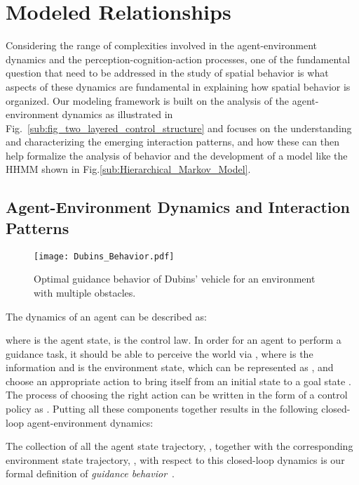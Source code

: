 \documentclass[journal]{IEEEtran}
\begin{document}
\section{Modeled Relationships}



Considering the range of complexities involved in the agent-environment dynamics and the perception-cognition-action processes, one of the fundamental question that need to be addressed in the study of spatial behavior is what aspects of these dynamics are fundamental in explaining how spatial behavior is organized.  Our modeling framework is built on the analysis of the agent-environment dynamics  as illustrated in Fig.~\ref{sub:fig_two_layered_control_structure} and focuses on the understanding and characterizing the emerging interaction patterns, and how these can then help formalize the analysis of behavior and the development of a model like the HHMM shown in Fig.\ref{sub:Hierarchical_Markov_Model}. 


\subsection{Agent-Environment Dynamics and Interaction Patterns}

\begin{figure}[!t]
\centering   \texttt{[image: Dubins\_Behavior.pdf]}
    \caption{Optimal guidance behavior of Dubins' vehicle for an environment with multiple obstacles.}
    \label{f:Dubins_Behavior}
\end{figure}



The dynamics of an agent can be described as:

where  is the agent state,  is the control law. In order for an agent to perform a guidance task, it should be able to perceive the world via , where  is the information and  is the environment state, which can be represented as , and choose an appropriate action  to bring itself from an initial state  to a goal state . The process of choosing the right action can be written in the form of a control policy as . Putting all these components together results in the following closed-loop agent-environment dynamics:
 
The collection of all the agent state trajectory, , together with the corresponding environment state trajectory, , with respect to this closed-loop dynamics is our formal definition of \textit{guidance behavior}~\cite{kong2011foundations}. 
\end{document}
